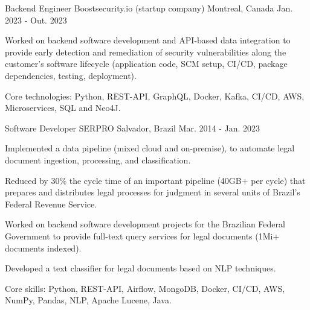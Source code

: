


\begin{cventries}


\cventry
{Backend Engineer} %
{Boostsecurity.io (startup company)} %
{Montreal, Canada} %
{Jan. 2023 - Out. 2023} %
{ %
\begin{cvitems}
	\item {Worked on backend software development and API-based data integration to provide early detection and remediation of security vulnerabilities along the customer's software lifecycle (application code, SCM setup, CI/CD, package dependencies, testing, deployment).}
	\item{Core technologies: Python, REST-API, GraphQL, Docker, Kafka, CI/CD, AWS, Microservices, SQL and Neo4J.}
\end{cvitems}
}


\cventry
{Software Developer} %
{SERPRO} %
{Salvador, Brazil} %
{Mar. 2014 - Jan. 2023} %
{ %
\begin{cvitems}
	\item{Implemented a data pipeline (mixed cloud and on-premise), to automate legal document ingestion, processing, and classification.}
	\item{Reduced by 30\% the cycle time of an important pipeline (40GB+ per cycle) that prepares and distributes legal processes for judgment in several units of Brazil’s Federal Revenue Service.}
	\item{Worked on backend software development projects for the Brazilian Federal Government to provide full-text query services for legal documents (1Mi+ documents indexed).}
	\item{Developed a text classifier for legal documents based on NLP techniques.}
	\item{Core skills: Python, REST-API, Airflow, MongoDB, Docker, CI/CD, AWS, NumPy, Pandas, NLP, Apache Lucene, Java.}
\end{cvitems}
}


\end{cventries}
